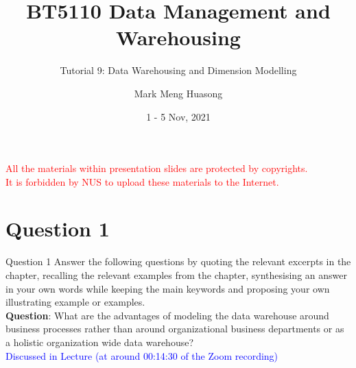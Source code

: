 \title{BT5110 Data Management and Warehousing}

\subtitle{Tutorial 9: Data Warehousing and Dimension Modelling}

\author{Mark Meng Huasong}



\date{1 - 5 Nov, 2021}

\begin{frame}
	\titlepage
	\begin{tcolorbox}
		\begin{center}
			{\scriptsize \textcolor{red}{All the materials within presentation slides are protected by copyrights.\\
					It is forbidden by NUS to upload these materials to the Internet.}}
		\end{center}
	\end{tcolorbox}
\end{frame}

\section*{Question 1}

\begin{frame}[fragile]{Question 1}
Answer the following questions by quoting the relevant excerpts in the chapter, recalling the relevant examples from the chapter, synthesising an answer in your own words while keeping the main keywords and proposing your own illustrating example or examples.\\\vspace{10pt}
\textbf{Question}: What are the advantages of modeling the data warehouse around business processes rather than around organizational business departments or as a holistic organization wide data warehouse?\\
\vspace{10pt}
\textcolor{blue}{Discussed in Lecture (at around 00:14:30 of the Zoom recording)}
\end{frame}

